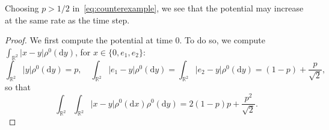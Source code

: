 \documentclass[11pt]{article}
\theoremstyle{definition}
\numberwithin{equation}{section}
\newcommand*{\dd}{\mathrm{d}}
\newcommand*{\dx}{\dd x}
\newcommand*{\dy}{\dd y}
\newcommand*\RR{\mathbb{R}}
\begin{document}
Choosing $p>1/2$ in~\eqref{eq:counterexample}, we see that the potential may increase at the same rate as the time step.

\begin{proof}
We first compute the potential at time $0$. To do so, we compute $\int_{\RR^2} \vert x- y \vert \rho^0(\dy)$, for $x \in \{0,e_{1},e_{2}\}$:
\begin{equation*}
\int_{\RR^2} \vert y \vert \rho^0(\dy) = p, \quad
\int_{\RR^2} \vert e_{1}- y \vert \rho^0(\dy) = \int_{\RR^2} \vert e_{2}- y \vert \rho^0(\dy) = (1-p) + \frac{p}{\sqrt{2}},
\end{equation*}
so that
\begin{equation*}
\int_{\RR^2}\int_{\RR^2} \vert x- y \vert\rho^0(\dx) \rho^0(\dy) = 2 (1-p) p + \frac{p^2}{\sqrt{2}}.
\end{equation*}


\end{proof}
\end{document}
